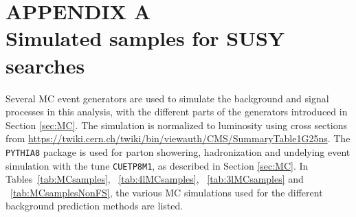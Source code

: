 


\appendix %

\chapter*{APPENDIX A\\ Simulated samples for SUSY searches} 
\noindent\justify
{} 
\setcounter{chapter}{1} 
\label{app:MC}
Several MC event generators are used to simulate the background and signal processes in this analysis, with the different parts of the generators introduced in Section \ref{sec:MC}. 
The simulation is normalized to luminosity using cross sections from \url{https://twiki.cern.ch/twiki/bin/viewauth/CMS/SummaryTable1G25ns}.
The \texttt{PYTHIA8} \cite{Sjostrand:2006za} package is used for parton showering, hadronization and undelying event simulation with the tune \texttt{CUETP8M1}, as described in Section \ref{sec:MC}.
In Tables~\ref{tab:MCsamples}, ~\ref{tab:4lMCsamples}, ~\ref{tab:3lMCsamples} and  ~\ref{tab:MCsamplesNonFS}, the various MC simulations used for the different background prediction methods 
are listed.
